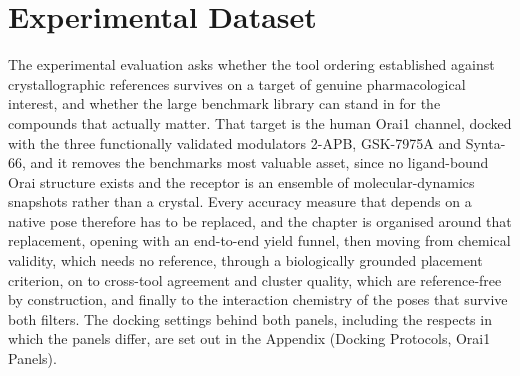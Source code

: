 \protect\hypertarget{_Toc235735934}{}{}

\hypertarget{experimental-dataset-1}{%
\section{Experimental Dataset}\label{experimental-dataset-1}}

The experimental evaluation asks whether the tool ordering established against crystallographic references survives on a target of genuine pharmacological interest, and whether the large benchmark library can stand in for the compounds that actually matter. That target is the human Orai1 channel, docked with the three functionally validated modulators 2-APB, GSK-7975A and Synta-66, and it removes the benchmark\textquotesingle s most valuable asset, since no ligand-bound Orai structure exists and the receptor is an ensemble of molecular-dynamics snapshots rather than a crystal. Every accuracy measure that depends on a native pose therefore has to be replaced, and the chapter is organised around that replacement, opening with an end-to-end yield funnel, then moving from chemical validity, which needs no reference, through a biologically grounded placement criterion, on to cross-tool agreement and cluster quality, which are reference-free by construction, and finally to the interaction chemistry of the poses that survive both filters. The docking settings behind both panels, including the respects in which the panels differ, are set out in the Appendix (Docking Protocols, Orai1 Panels).

